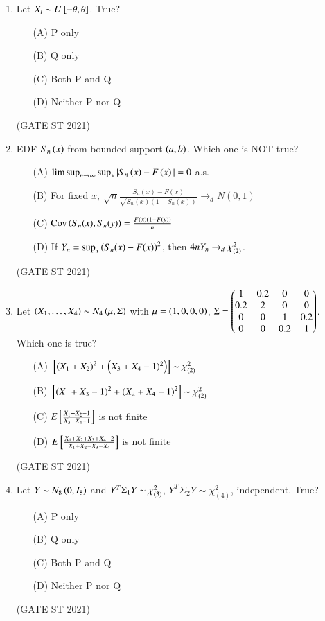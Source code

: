 \documentclass[journal,12pt,onecolumn]{IEEEtran}
\theoremstyle{remark}
\begin{document}
\begin{enumerate}
\item
Let $X_i \sim U{}\left[-\theta,\theta\right]$. True?
\begin{enumerate}
\item[(A)] P only
\item[(B)] Q only
\item[(C)] Both P and Q
\item[(D)] Neither P nor Q
\end{enumerate}
\hfill (GATE ST 2021) \\
\item
EDF $S_n\left(x\right)$ from bounded support $\left(a,b\right)$. Which one is NOT true?
\begin{enumerate}
\item[(A)] $\limsup_{n\to\infty} \sup_x |S_n\left(x\right)-F\left(x\right)| = 0$ a.s.
\item[(B)] For fixed $x$, $\sqrt{n}\frac{S_n(x)-F(x)}{\sqrt{S_n(x)(1-S_n(x))}} \to_d N(0,1)$
\item[(C)] $\text{Cov}\left(S_n(x), S_n(y)\right) = \frac{F\left(x\right)\left(1-F\left(y\right)\right)}{n}$
\item[(D)] If $Y_n = \sup_x \left(S_n(x)-F(x)\right)^2$, then $4n Y_n \to_d \chi^2_{\left(2\right)}$.
\end{enumerate}
\hfill (GATE ST 2021) \\


\item
Let $\left(X_1,\dots,X_4\right) \sim N_4\left(\mu,\Sigma\right)$ with  
$\mu = \left(1,0,0,0\right)$, $\Sigma = \begin{pmatrix} 1 & 0.2 & 0 & 0 \\ 0.2 & 2 & 0 & 0 \\ 0 & 0 & 1 & 0.2 \\ 0 & 0 & 0.2 & 1 \end{pmatrix}$.  
Which one is true?
\begin{enumerate}
\item[(A)] ${}\left[\left(X_1+X_2\right)^2 + \left(X_3+X_4-1)^2\right)\right] \sim \chi^2_{(2)}$
\item[(B)] ${}\left[\left(X_1+X_3-1\right)^2 + \left(X_2+X_4-1\right)^2\right]\sim \chi^2_{(2)}$
\item[(C)] $E{}\left[\frac{X_1+X_2-1}{X_3+X_4-1}\right]$ is not finite
\item[(D)] $E{}\left[ \frac{X_1+X_2+X_3+X_4-2}{X_1+X_2-X_3-X_4} \right]$ is not finite
\end{enumerate}
\hfill (GATE ST 2021) \\

\item
Let $Y \sim N_8\left(0,I_8\right)$ and $Y^T\Sigma_1Y \sim \chi^2_{\left(3\right)}$, $Y^T\Sigma_2Y \sim \chi^2_{(4)}$, independent. True?
\begin{enumerate}
\item[(A)] P only
\item[(B)] Q only
\item[(C)] Both P and Q
\item[(D)] Neither P nor Q
\end{enumerate}
\hfill (GATE ST 2021) \\



\end{enumerate}
\end{document}
